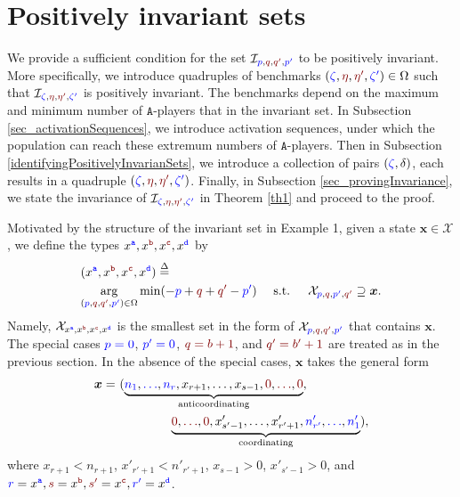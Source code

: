\documentclass[10 pt,twocolumn,journal]{IEEEtran}
\theoremstyle{plain}
\newcommand{\A}{\mathcal{A}}
\newcommand{\I}{\mathcal{I}}
\newcommand{\X}{\mathcal{X}}
\newcommand{\x}{\bm{x}}
\newcommand{\p}{\tb{p}}
\newcommand{\pp}{\tb{p'}}
\newcommand{\q}{\tr{q}}
\newcommand{\qq}{\tr{q'}}
\renewcommand{\r}{\tb{\zeta}}
\newcommand{\rr}{\tb{\zeta'}}
\newcommand{\s}{\tr{\eta}}
\renewcommand{\ss}{\tr{\eta'}}
\renewcommand{\d}{{\delta}}
\newcommand{\n}{\tb{\mathtt{a}}}
\renewcommand{\o}{\tr{\mathtt{b}}}
\newcommand{\oo}{\tr{\mathtt{c}}}
\newcommand{\nn}{\tb{\mathtt{d}}}
\renewcommand{\A}{\mathtt{A}}
\newcommand{\tb}{\textcolor{blue}}
\newcommand{\tr}{\textcolor{Myred}}
\theoremstyle{definition}
\begin{document}


\section{Positively invariant sets} \label{sec_positivelyInvariantSets}
We provide a sufficient condition for the set $\I_{\p,\q,\qq,\pp}$ to be positively invariant.
More specifically, we introduce quadruples of benchmarks $(\r, \s, \ss, \rr)\in\Omega$ such that $\I_{\r, \s, \ss, \rr}$ is positively invariant. 
The benchmarks depend on the maximum and minimum number of $\A$-players that in the invariant set. 
In Subsection \ref{sec_activationSequences}, we introduce activation sequences, under which the population can reach these extremum numbers of $\A$-players.
Then in Subsection \ref{identifyingPositivelyInvarianSets}, we introduce a collection of pairs $(\r, \d)$, each results in a quadruple $(\r, \s, \ss, \rr)$.
Finally, in Subsection \ref{sec_provingInvariance}, we state the invariance of $\I_{\r, \s, \ss, \rr}$ in Theorem \ref{th1} and proceed to the proof.

Motivated by the structure of the invariant set in Example 1, given a state $\x\in\X$, we define the types $x^{\n},x^{\o} ,x^{\oo},x^{\nn}$ by
\begin{align*}
    &(x^{\n},x^{\o} ,x^{\oo},x^{\nn})\overset{\Delta}{=} \\
    &\underset{(\p,\q,\qq,\pp)\in\Omega}{\arg}\min(-\p+\q+\qq-\pp) \quad \text{ s.t. }\quad \X_{\p,\q,\pp,\qq} \supseteq \x.
\end{align*}
Namely, $\X_{x^{\n},x^{\o},x^{\oo},x^{\nn}}$ is the smallest set in the form of $\X_{\p,\q,\qq,\pp}$ that contains $\x$. 
The special cases $\tb{p=0}$, $\tb{p' =0}$, $\tr{q = b+1}$, and $\tr{q'  = b'+1}$ are treated as in the previous section.
In the absence of the special cases, $\x$ takes the general form
\begin{align*}
    \x = 
    \ &(\underbrace{\tb{n_1},\tb{\ldots},\tb{n_r}, x_{r+1},\ldots, x_{s-1}, \tr{0},\tr{\ldots}, \tr{0}}_{\text{anticoordinating}}, \\
    &\qquad\qquad\underbrace{\tr{0}, \tr{\ldots},\tr{0}, x'_{s'-1},\ldots, x'_{r'+1}, \tb{n'_{r'}},\tb{\ldots},\tb{n'_1}}_{\text{coordinating}}),
\end{align*}
where $x_{r+1}<n_{r+1}$, $x'_{r'+1}<n'_{r'+1}$, $x_{s-1}>0$,  $x'_{s'-1}>0$, and 
 $\tb{r} = x^{\n}, \tr{s} = x^{\o}, \tr{s'} = x^{\oo}, \tb{r'} = x^{\nn}$. 
\end{document}
